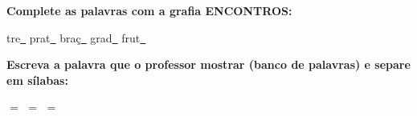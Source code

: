 \noindent\textbf{Complete as palavras com a grafia ENCONTROS:}
\begin{center}
  tre\underline{~} \quad prat\underline{~} \quad braç\underline{~} \quad grad\underline{~} \quad frut\underline{~}
\end{center}

\noindent\textbf{Escreva a palavra que o professor mostrar (banco de palavras) e separe em sílabas:}

\begin{center}
  \underline{\hspace{2cm}} $=$ \underline{\hspace{2cm}} \quad \underline{\hspace{2cm}} $=$ \underline{\hspace{2cm}} \quad \underline{\hspace{2cm}} $=$ \underline{\hspace{2cm}}
  \end{center}




